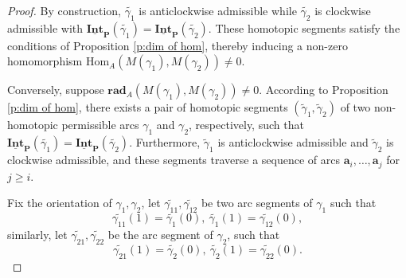 \documentclass[a4paper,10pt]{amsart}
\theoremstyle{plain}          %
\theoremstyle{definition}
\def\af{\mathbf{a}}
\def\Pf{\mathbf{P}}
\def\PP{\mathbf{P}}
\newcommand{\Intv}{\underline{\mathbf{Int}}}
\newcommand{\Hom}{\mathrm{Hom}}
\begin{document}
\begin{proof}
     By construction, $\widetilde{\gamma_1}$ is anticlockwise admissible while $\widetilde{\gamma_2}$ is clockwise admissible with $\Intv_{\PP}(\widetilde{\gamma_1})=\Intv_{\PP}(\widetilde{\gamma_2})$. These homotopic segments satisfy the conditions of Proposition \ref{p:dim of hom}, thereby inducing a non-zero homomorphism $\Hom_{A}(M(\gamma_1), M(\gamma_2)) \neq 0$.


   Conversely, suppose $\mathbf{rad}_{A}(M(\gamma_1), M(\gamma_2)) \neq 0$. According to Proposition \ref{p:dim of hom}, there exists a pair of homotopic segments $(\widetilde{\gamma}_1, \widetilde{\gamma}_2)$ of two non-homotopic permissible arcs $\gamma_1$ and $\gamma_2$, respectively, such that $\Intv_{\PP}(\widetilde{\gamma_1})=\Intv_{\PP}(\widetilde{\gamma_2})$. Furthermore, $\widetilde{\gamma}_1$ is anticlockwise admissible and $\widetilde{\gamma}_2$ is clockwise admissible, and these segments traverse a sequence of arcs $\af_i, \dots, \af_j$ for $j \ge i$. 
   

  Fix the orientation of $\gamma_1,\gamma_2$, let $\widetilde{\gamma_{11}},\widetilde{\gamma_{12}}$ be two arc segments of $\gamma_1$ such that \[\widetilde{\gamma_{11}}(1)=\widetilde{\gamma_1}(0),~\widetilde{\gamma_1}(1)=\widetilde{\gamma_{12}}(0),\] similarly, let $\widetilde{\gamma_{21}},\widetilde{\gamma_{22}}$ be the arc segment of $\gamma_2$, such that \[\widetilde{\gamma_{21}}(1)=\widetilde{\gamma_2}(0),~\widetilde{\gamma_2}(1)=\widetilde{\gamma_{22}}(0).\]
  

\end{proof}
\end{document}
